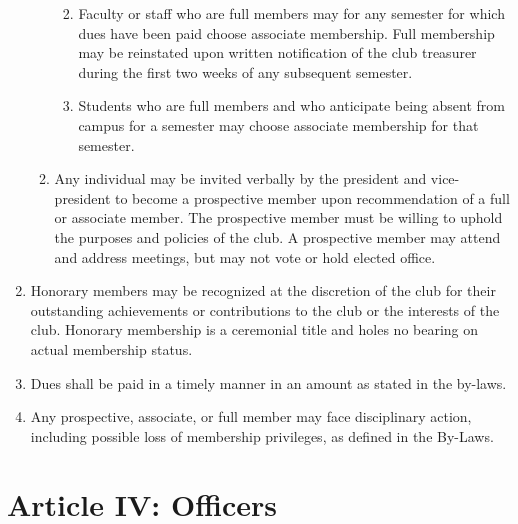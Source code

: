 \documentclass[
]{article}
\providecommand{\tightlist}{%
  \setlength{\itemsep}{0pt}\setlength{\parskip}{0pt}}
\begin{document}
\begin{enumerate}
\begin{enumerate}
    \begin{enumerate}
    \def\labelenumiii{\roman{enumiii}.}
    \tightlist
    \item
      Faculty or staff who are full members may for any semester for
      which dues have been paid choose associate membership. Full
      membership may be reinstated upon written notification of the club
      treasurer during the first two weeks of any subsequent semester.
    \item
      Students who are full members and who anticipate being absent from
      campus for a semester may choose associate membership for that
      semester.
    \end{enumerate}
  \item
    Any individual may be invited verbally by the president and
    vice-president to become a prospective member upon recommendation of
    a full or associate member. The prospective member must be willing
    to uphold the purposes and policies of the club. A prospective
    member may attend and address meetings, but may not vote or hold
    elected office.
  \end{enumerate}
\item
  Honorary members may be recognized at the discretion of the club for
  their outstanding achievements or contributions to the club or the
  interests of the club. Honorary membership is a ceremonial title and
  holes no bearing on actual membership status.
\item
  Dues shall be paid in a timely manner in an amount as stated in the
  by-laws.
\item
  Any prospective, associate, or full member may face disciplinary
  action, including possible loss of membership privileges, as defined
  in the By-Laws.
\end{enumerate}

\hypertarget{article-iv-officers}{%
\section{Article IV: Officers}\label{article-iv-officers}}
\end{document}
